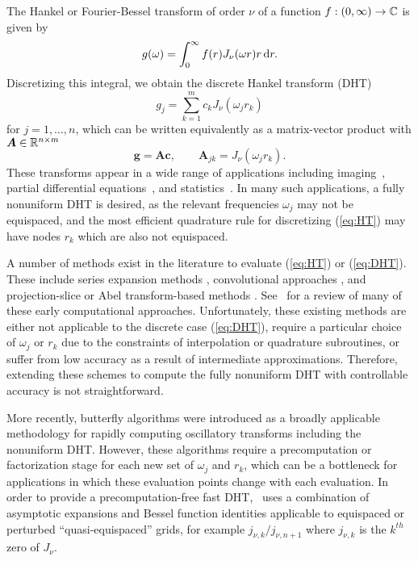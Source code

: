 The Hankel or Fourier-Bessel transform of order $\nu$ of a function $f : (0,
\infty) \to \mathbb{C}$ is given by
\begin{equation} \label{eq:HT}
    g(\omega) = \int_0^\infty f(r) J_\nu(\omega r) r \mathop{}\!\mathrm{d}{r}.
\end{equation}
Discretizing this integral, we obtain the discrete Hankel transform (DHT)
\begin{equation} \label{eq:DHT}
    g_j = \sum_{k=1}^m c_k J_\nu(\omega_j r_k)
\end{equation}
for $j=1, \dots, n$, which can be written equivalently as a matrix-vector
product with $\bm{A} \in \mathbb{R}^{n \times m}$
\begin{equation}
    \bm{g} = \bm{A}\bm{c}, \qquad \bm{A}_{jk} = J_\nu(\omega_j r_k).
\end{equation}
These transforms appear in a wide range of applications including
imaging~\citep{higgins1988hankel, zhao2013fourier}, partial differential
equations~\citep{bisseling1985fast,ali1999generalized}, and
statistics~\cite{lord1954a, genton2002nonparametric}. In many such applications,
a fully nonuniform DHT is desired, as the relevant frequencies $\omega_j$ may
not be equispaced, and the most efficient quadrature rule for discretizing
(\ref{eq:HT}) may have nodes $r_k$ which are also not equispaced.

A number of methods exist in the literature to evaluate (\ref{eq:HT}) or
(\ref{eq:DHT}). These include series expansion methods
\citep{lord1954b,brunol1977fourier,cavanagh1979numerical}, convolutional
approaches \citep{siegman1977quasi, johansen1979fast, mook1983algorithm}, and
projection-slice or Abel transform-based methods
\citep{oppenheim1980computation, hansen1985fast, kapur1995algorithm}.
See~\cite{cree1993algorithms} for a review of many of these early computational
approaches. Unfortunately, these existing methods are either not applicable to
the discrete case (\ref{eq:DHT}), require a particular choice of $\omega_j$ or
$r_k$ due to the constraints of interpolation or quadrature subroutines, or
suffer from low accuracy as a result of intermediate approximations. Therefore,
extending these schemes to compute the fully nonuniform DHT with controllable
accuracy is not straightforward. 

More recently, butterfly algorithms \citep{oneil2010algorithm, li2015butterfly,
pang2020interpolative} were introduced as a broadly applicable methodology for
rapidly computing oscillatory transforms including the nonuniform DHT. However,
these algorithms require a precomputation or factorization stage for each new
set of $\omega_j$ and $r_k$, which can be a bottleneck for applications in which
these evaluation points change with each evaluation. In order to provide a
precomputation-free fast DHT,~\cite{townsend2015fast} uses a combination of
asymptotic expansions and Bessel function identities applicable to equispaced or
perturbed ``quasi-equispaced'' grids, for example $j_{\nu,k} / j_{\nu,n+1}$
where $j_{\nu,k}$ is the $k^{th}$ zero of $J_\nu$.

